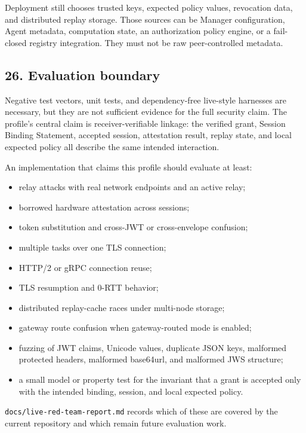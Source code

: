 \documentclass[
]{article}
\providecommand{\tightlist}{%
  \setlength{\itemsep}{0pt}\setlength{\parskip}{0pt}}
\begin{document}
Deployment still chooses trusted keys, expected policy values,
revocation data, and distributed replay storage. Those sources can be
Manager configuration, Agent metadata, computation state, an
authorization policy engine, or a fail-closed registry integration. They
must not be raw peer-controlled metadata.

\subsection{26. Evaluation boundary}\label{evaluation-boundary}

Negative test vectors, unit tests, and dependency-free live-style
harnesses are necessary, but they are not sufficient evidence for the
full security claim. The profile's central claim is receiver-verifiable
linkage: the verified grant, Session Binding Statement, accepted
session, attestation result, replay state, and local expected policy all
describe the same intended interaction.

An implementation that claims this profile should evaluate at least:

\begin{itemize}
\tightlist
\item
  relay attacks with real network endpoints and an active relay;
\item
  borrowed hardware attestation across sessions;
\item
  token substitution and cross-JWT or cross-envelope confusion;
\item
  multiple tasks over one TLS connection;
\item
  HTTP/2 or gRPC connection reuse;
\item
  TLS resumption and 0-RTT behavior;
\item
  distributed replay-cache races under multi-node storage;
\item
  gateway route confusion when gateway-routed mode is enabled;
\item
  fuzzing of JWT claims, Unicode values, duplicate JSON keys, malformed
  protected headers, malformed base64url, and malformed JWS structure;
\item
  a small model or property test for the invariant that a grant is
  accepted only with the intended binding, session, and local expected
  policy.
\end{itemize}

\texttt{docs/live-red-team-report.md} records which of these are covered
by the current repository and which remain future evaluation work.
\end{document}

